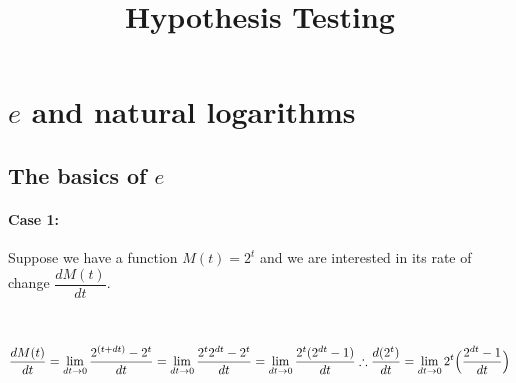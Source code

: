 \documentclass[float=false,crop=false]{standalone}
\title{Hypothesis Testing}
\begin{document}
    
    
    \maketitle
    
    

    
    \section{\texorpdfstring{\(e\) and natural
logarithms}{e and natural logarithms}}\label{e-and-natural-logarithms}

\subsection{\texorpdfstring{The basics of
\(e\)}{The basics of e}}\label{the-basics-of-e}

\paragraph{Case 1:}\label{case-1}

Suppose we have a function \(M(t) = 2^t\) and we are interested in its
rate of change \(\dfrac{dM(t)}{dt}\).
    \begin{center}
    \end{center}
    { \hspace*{\fill} \\}
    
    \[
\dfrac{dM(t)}{dt} =  \lim_{dt \to 0} \dfrac{2^{(t+dt)}-2^t}{dt} =  \lim_{dt \to 0} \dfrac{2^t2^{dt} - 2^t}{dt} 
=  \lim_{dt \to 0} \dfrac{2^t(2^{dt} - 1)}{dt} \\
\therefore \dfrac{d(2^t)}{dt} = \lim_{dt \to 0} 2^t\Big(\dfrac{2^{dt}-1}{dt}\Big) 
\]
\end{document}

